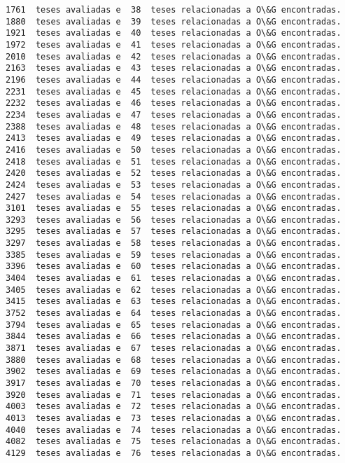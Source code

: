 \documentclass[11pt]{article}
\begin{document}
\begin{Verbatim}[commandchars=\\\{\}]
1761  teses avaliadas e  38  teses relacionadas a O\&G encontradas.
1880  teses avaliadas e  39  teses relacionadas a O\&G encontradas.
1921  teses avaliadas e  40  teses relacionadas a O\&G encontradas.
1972  teses avaliadas e  41  teses relacionadas a O\&G encontradas.
2010  teses avaliadas e  42  teses relacionadas a O\&G encontradas.
2163  teses avaliadas e  43  teses relacionadas a O\&G encontradas.
2196  teses avaliadas e  44  teses relacionadas a O\&G encontradas.
2231  teses avaliadas e  45  teses relacionadas a O\&G encontradas.
2232  teses avaliadas e  46  teses relacionadas a O\&G encontradas.
2234  teses avaliadas e  47  teses relacionadas a O\&G encontradas.
2388  teses avaliadas e  48  teses relacionadas a O\&G encontradas.
2413  teses avaliadas e  49  teses relacionadas a O\&G encontradas.
2416  teses avaliadas e  50  teses relacionadas a O\&G encontradas.
2418  teses avaliadas e  51  teses relacionadas a O\&G encontradas.
2420  teses avaliadas e  52  teses relacionadas a O\&G encontradas.
2424  teses avaliadas e  53  teses relacionadas a O\&G encontradas.
2427  teses avaliadas e  54  teses relacionadas a O\&G encontradas.
3101  teses avaliadas e  55  teses relacionadas a O\&G encontradas.
3293  teses avaliadas e  56  teses relacionadas a O\&G encontradas.
3295  teses avaliadas e  57  teses relacionadas a O\&G encontradas.
3297  teses avaliadas e  58  teses relacionadas a O\&G encontradas.
3385  teses avaliadas e  59  teses relacionadas a O\&G encontradas.
3396  teses avaliadas e  60  teses relacionadas a O\&G encontradas.
3404  teses avaliadas e  61  teses relacionadas a O\&G encontradas.
3405  teses avaliadas e  62  teses relacionadas a O\&G encontradas.
3415  teses avaliadas e  63  teses relacionadas a O\&G encontradas.
3752  teses avaliadas e  64  teses relacionadas a O\&G encontradas.
3794  teses avaliadas e  65  teses relacionadas a O\&G encontradas.
3844  teses avaliadas e  66  teses relacionadas a O\&G encontradas.
3871  teses avaliadas e  67  teses relacionadas a O\&G encontradas.
3880  teses avaliadas e  68  teses relacionadas a O\&G encontradas.
3902  teses avaliadas e  69  teses relacionadas a O\&G encontradas.
3917  teses avaliadas e  70  teses relacionadas a O\&G encontradas.
3920  teses avaliadas e  71  teses relacionadas a O\&G encontradas.
4003  teses avaliadas e  72  teses relacionadas a O\&G encontradas.
4013  teses avaliadas e  73  teses relacionadas a O\&G encontradas.
4040  teses avaliadas e  74  teses relacionadas a O\&G encontradas.
4082  teses avaliadas e  75  teses relacionadas a O\&G encontradas.
4129  teses avaliadas e  76  teses relacionadas a O\&G encontradas.

\end{Verbatim}
\end{document}
